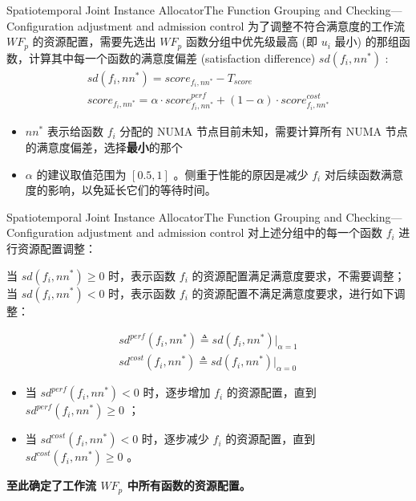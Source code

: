 \documentclass[aspectratio=169]{beamer}
\begin{document}
\begin{frame}{Spatiotemporal Joint Instance Allocator}{The Function Grouping and Checking---Configuration adjustment and admission control}
  为了调整不符合满意度的工作流 $WF_p$ 的资源配置，需要先选出 $WF_p$ 函数分组中优先级最高 (即 $u_i$ 最小) 的那组函数，计算其中每一个函数的满意度偏差 (satisfaction difference) $sd(f_i, nn^{*})$ :
  \begin{gather*}
    sd(f_i, nn^{*}) = score_{f_i, nn^{*}} - T_{score} \\
    score_{f_i, nn^{*}} = \alpha \cdot score_{f_i, nn^{*}}^{perf} + (1-\alpha) \cdot score_{f_i, nn^{*}}^{cost}
  \end{gather*}
  \begin{itemize}
    \item $nn^{*}$ 表示给函数 $f_i$ 分配的 NUMA 节点目前未知，需要计算所有 NUMA 节点的满意度偏差，选择\textbf{最小}的那个
    \item $\alpha$ 的建议取值范围为 $[0.5, 1]$ 。侧重于性能的原因是减少 $f_i$ 对后续函数满意度的影响，以免延长它们的等待时间。
  \end{itemize}
\end{frame}

\begin{frame}{Spatiotemporal Joint Instance Allocator}{The Function Grouping and Checking---Configuration adjustment and admission control}
  对上述分组中的每一个函数 $f_i$ 进行资源配置调整：

  当 $sd(f_i, nn^{*}) \geqslant 0$ 时，表示函数 $f_i$ 的资源配置满足满意度要求，不需要调整；\\当 $sd(f_i, nn^{*}) < 0$ 时，表示函数 $f_i$ 的资源配置不满足满意度要求，进行如下调整：
  \begin{definition}
    \begin{gather*}
      sd^{perf}(f_i, nn^{*}) \triangleq sd(f_i, nn^{*}) \big|_{\alpha = 1} \\
      sd^{cost}(f_i, nn^{*}) \triangleq sd(f_i, nn^{*}) \big|_{\alpha = 0}
    \end{gather*}
  \end{definition}
  \begin{itemize}
    \item 当 $sd^{perf}(f_i, nn^{*}) < 0$ 时，逐步增加 $f_i$ 的资源配置，直到 $sd^{perf}(f_i, nn^{*}) \geqslant 0$ ；
    \item 当 $sd^{cost}(f_i, nn^{*}) < 0$ 时，逐步减少 $f_i$ 的资源配置，直到 $sd^{cost}(f_i, nn^{*}) \geqslant 0$ 。
  \end{itemize}

  \textbf{至此确定了工作流 $WF_p$ 中所有函数的资源配置。}
\end{frame}
\end{document}
